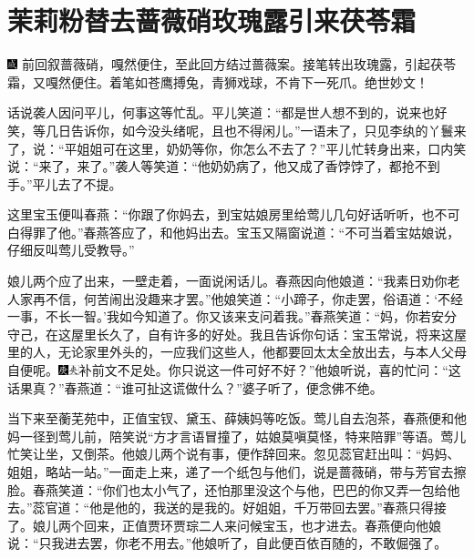 

\chapter{茉莉粉替去蔷薇硝\hspace{.5em}玫瑰露引来茯苓霜}

{\includegraphics[width=3mm]{../Images/00005}  \kaishu 前回叙蔷薇硝，嘎然便住，至此回方结过蔷薇案。接笔转出玫瑰露，引起茯苓霜，又嘎然便住。着笔如苍鹰搏兔，青狮戏球，不肯下一死爪。绝世妙文！}

话说袭人因问平儿，何事这等忙乱。平儿笑道：“都是世人想不到的，说来也好笑，等几日告诉你，如今没头绪呢，且也不得闲儿。”一语未了，只见李纨的丫鬟来了，说：“平姐姐可在这里，奶奶等你，你怎么不去了？”平儿忙转身出来，口内笑说：“来了，来了。”袭人等笑道：“他奶奶病了，他又成了香饽饽了，都抢不到手。”平儿去了不提。

这里宝玉便叫春燕：“你跟了你妈去，到宝姑娘房里给莺儿几句好话听听，也不可白得罪了他。”春燕答应了，和他妈出去。宝玉又隔窗说道：“不可当着宝姑娘说，仔细反叫莺儿受教导。”

娘儿两个应了出来，一壁走着，一面说闲话儿。春燕因向他娘道：“我素日劝你老人家再不信，何苦闹出没趣来才罢。”他娘笑道：“小蹄子，你走罢，俗语道：‘不经一事，不长一智。’我如今知道了。你又该来支问着我。”春燕笑道：“妈，你若安分守己，在这屋里长久了，自有许多的好处。我且告诉你句话：宝玉常说，将来这屋里的人，无论家里外头的，一应我们这些人，他都要回太太全放出去，与本人父母自便呢。{\includegraphics[width=3mm]{../Images/00004}\includegraphics[width=3mm]{../Images/00012}\footnotesize \kaishu 补前文不足处。}你只说这一件可好不好？”他娘听说，喜的忙问：“这话果真？”春燕道：“谁可扯这谎做什么？”婆子听了，便念佛不绝。

当下来至蘅芜苑中，正值宝钗、黛玉、薛姨妈等吃饭。莺儿自去泡茶，春燕便和他妈一径到莺儿前，陪笑说“方才言语冒撞了，姑娘莫嗔莫怪，特来陪罪”等语。莺儿忙笑让坐，又倒茶。他娘儿两个说有事，便作辞回来。忽见蕊官赶出叫：“妈妈、姐姐，略站一站。”一面走上来，递了一个纸包与他们，说是蔷薇硝，带与芳官去擦脸。春燕笑道：“你们也太小气了，还怕那里没这个与他，巴巴的你又弄一包给他去。”蕊官道：“他是他的，我送的是我的。好姐姐，千万带回去罢。”春燕只得接了。娘儿两个回来，正值贾环贾琮二人来问候宝玉，也才进去。春燕便向他娘说：“只我进去罢，你老不用去。”他娘听了，自此便百依百随的，不敢倔强了。

